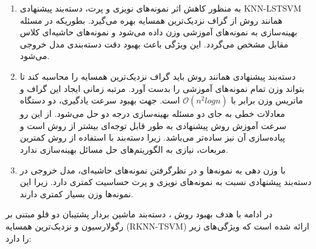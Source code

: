 \begin{enumerate}
	\item به منظور کاهش اثر نمونه‌های نویزی و پرت، دسته‌بند پیشنهادی \gls*{KNN-LSTSVM} همانند روش  از گراف نزدیک‌‌ترین همسایه بهره می‌گیرد. بطور‌یکه در مسئله بهینه‌سازی به نمونه‌های آموزشی وزن داده می‌شود و نمونه‌های حاشیه‌ای کلاس مقابل مشخص می‌‌گردد. این ویژگی باعث بهبود دقت دسته‌بندی مدل خروجی می‌شود.
	
	\item دسته‌بند پیشنهادی همانند روش  باید گراف نزدیک‌ترین همسایه را محاسبه کند تا بتواند وزن تمام نمونه‌های آموزشی را بدست آورد. مرتبه زمانی ایجاد این گراف و ماتریس وزن برابر با $\mathcal{O}(n^{2}logn)$ است. جهت بهبود سرعت یادگیری، دو دستگاه معادلات خطی به جای دو مسئله بهینه‌سازی درجه دو حل می‌شود. از این رو سرعت آموزش روش پیشنهادی به طور قابل توجه‌ای بیشتر از روش  است و پیاده‌سازی آن نیز ساده‌تر می‌باشد. زیرا دسته‌بند  با استفاده از روش کمترین مربعات، نیازی به الگوریتم‌های حل مسائل بهینه‌سازی ندارد.
	
	\item با وزن دهی به نمونه‌ها و در نظرگرفتن نمونه‌های حاشیه‌ای، مدل خروجی در دسته‌بند پیشنهادی نسبت به نمونه‌های نویزی و پرت حساسیت کمتری دارد. زیرا این نمونه‌ها وزن بسیار کمتری دارند.
	
\end{enumerate}

در ادامه با هدف بهبود روش ، دسته‌بند ماشین بردار پشتیبان دو قلو مبتنی بر رگولارسیون و نزدیک‌ترین همسایه  (\gls{RKNN-TSVM}) ارائه شده است که ويژگی‌های زیر را دارد:

